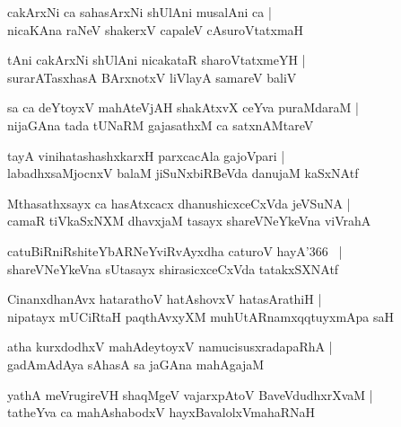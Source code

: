 \documentclass[twoside,12pt,openright]{book}
\newcounter{shloka}[chapter]
\begin{document}
\begin{shloka}%
cakArxNi ca sahasArxNi shUlAni musalAni ca |\\
nicaKAna raNeV shakerxV capaleV cAsuroVtatxmaH 
\end{shloka}

\begin{shloka}%
tAni cakArxNi shUlAni nicakataR sharoVtatxmeYH |\\
surarATasxhasA BArxnotxV liVlayA samareV baliV 
\end{shloka}

\begin{shloka}%
sa ca deYtoyxV mahAteVjAH shakAtxvX ceYva puraMdaraM |\\
nijaGAna tada tUNaRM gajasathxM ca satxnAMtareV 
\end{shloka}

\begin{shloka}%
tayA vinihatashashxkarxH parxcacAla gajoVpari |\\
labadhxsaMjocnxV balaM jiSuNxbiRBeVda danujaM kaSxNAtf
\end{shloka}

\begin{shloka}%
Mthasathxsayx ca hasAtxcacx dhanushicxceCxVda jeVSuNA |\\
camaR tiVkaSxNXM dhavxjaM tasayx shareVNeYkeVna viVrahA 
\end{shloka}

\begin{shloka}%
catuBiRniRshiteYbARNeYviRvAyxdha caturoV hayA\char'366 ~|\\
shareVNeYkeVna sUtasayx shirasicxceCxVda tatakxSXNAtf
\end{shloka}

\begin{shloka}%
CinanxdhanAvx hatarathoV hatAshovxV hatasArathiH |\\
nipatayx mUCiRtaH paqthAvxyXM muhUtARnamxqqtuyxmApa saH 
\end{shloka}

\begin{shloka}%
atha kurxdodhxV mahAdeytoyxV namucisusxradapaRhA |\\
gadAmAdAya sAhasA sa jaGAna mahAgajaM 
\end{shloka}

\begin{shloka}%
yathA meVrugireVH shaqMgeV vajarxpAtoV BaveVdudhxrXvaM |\\
tatheYva ca mahAshabodxV hayxBavalolxVmahaRNaH  
\end{shloka}
\end{document}
